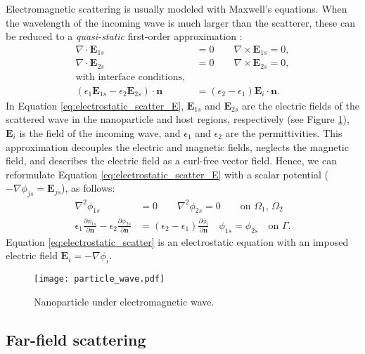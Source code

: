 Electromagnetic scattering is usually modeled with Maxwell's equations.
When the wavelength of the incoming wave is much larger than the
scatterer, these can be reduced to a \emph{quasi-static} 
first-order approximation \cite{MayergoyzZhang2007}:
%
\begin{align} \label{eq:electrostatic_scatter_E}
\nabla \cdot \mathbf{E}_{1s} &= 0 \qquad \nabla \times \mathbf{E}_{1s} = 0, \nonumber \\
\nabla \cdot \mathbf{E}_{2s} &= 0 \qquad \nabla \times \mathbf{E}_{2s} = 0, \nonumber \\
\text{with interface conditions, } \nonumber \\
(\epsilon_1\mathbf{E}_{1s} - \epsilon_2\mathbf{E}_{2s})\cdot\mathbf{n} &= (\epsilon_2-\epsilon_1)\mathbf{E}_i\cdot \mathbf{n}.
\end{align}
%
In Equation \eqref{eq:electrostatic_scatter_E}, $\mathbf{E}_{1s}$ and $\mathbf{E}_{2s}$ 
are the electric fields of the scattered wave in the nanoparticle and host regions, respectively 
(see Figure \ref{fig:part_wave}), 
$\mathbf{E}_{i}$ is the field of the incoming wave, and $\epsilon_1$ 
and $\epsilon_2$ are the permittivities.
This approximation decouples the electric and magnetic fields, neglects the magnetic field, 
and describes the electric field as a curl-free vector field.
Hence, we can reformulate Equation \eqref{eq:electrostatic_scatter_E} with a scalar potential
($-\nabla \phi_{js} = \mathbf{E}_{js}$), as follows:
%
\begin{align} \label{eq:electrostatic_scatter}
\nabla^2 \phi_{1s} &= 0 \qquad \nabla^2 \phi_{2s} = 0 \qquad\text{on $\Omega_1$, $\Omega_2$} \nonumber \\
\epsilon_1\frac{\partial\phi_{1s}}{\partial \mathbf{n}} - \epsilon_2\frac{\partial\phi_{2s}}{\partial\mathbf{n}} &= (\epsilon_2-\epsilon_1)\frac{\partial\phi_i}{\partial\mathbf{n}} \quad \phi_{1s} = \phi_{2s} \quad \text{on $\Gamma$}.
\end{align}
%
Equation \eqref{eq:electrostatic_scatter} is an electrostatic equation 
with an imposed electric field $\mathbf{E}_i=-\nabla\phi_i$.

\begin{figure}[h] %
   \centering
   \texttt{[image: particle\_wave.pdf]} 
   \caption{Nanoparticle under electromagnetic wave.}
   \label{fig:part_wave}
\end{figure}

\subsection{Far-field scattering} \label{sec:ff_scattering}

